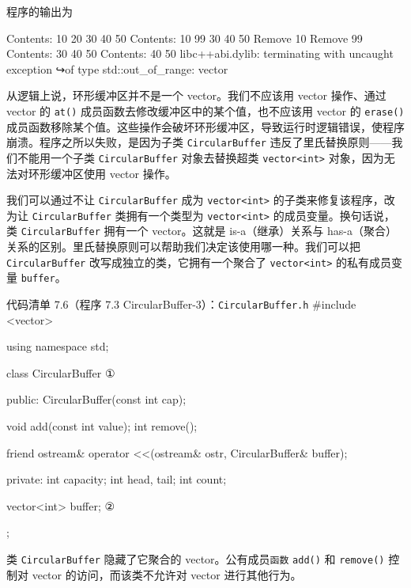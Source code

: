 程序的输出为

\begin{codebox}
Contents: 10 20 30 40 50 
Contents: 10 99 30 40 50 
Remove 10
Remove 99
Contents: 30 40 50 
Contents: 40 50 libc++abi.dylib: terminating with uncaught exception 
↪of type std::out_of_range: vector
\end{codebox}

从逻辑上说，环形缓冲区并不是一个 vector。我们不应该用 vector 操作、通过 vector 的 \texttt{at()} 成员函数去修改缓冲区中的某个值，也不应该用 vector 的 \texttt{erase()} 成员函数移除某个值。这些操作会破坏环形缓冲区，导致运行时逻辑错误，使程序崩溃。程序之所以失败，是因为子类 \texttt{Circular\allowbreak{}Buffer} 违反了里氏替换原则——我们不能用一个子类 \texttt{Circular\allowbreak{}Buffer} 对象去替换超类 \texttt{vector<int>} 对象，因为无法对环形缓冲区使用 vector 操作。

我们可以通过不让 \texttt{Circular\allowbreak{}Buffer} 成为 \texttt{vector<int>} 的子类来修复该程序，改为让 \texttt{Circular\allowbreak{}Buffer} 类拥有一个类型为 \texttt{vector<int>} 的成员变量。换句话说，类 \texttt{Circular\allowbreak{}Buffer} 拥有一个 vector。这就是 is-a（继承）关系与 has-a（聚合）关系的区别。里氏替换原则可以帮助我们决定该使用哪一种。我们可以把 \texttt{Circular\allowbreak{}Buffer} 改写成独立的类，它拥有一个聚合了 \texttt{vector<int>} 的私有成员变量 \texttt{buffer}。

\begin{codeboxt}{代码清单 7.6（程序 7.3 CircularBuffer-3）：\texttt{Circular\allowbreak{}Buffer.\allowbreak{}h}}
#include <vector>

using namespace std;

class CircularBuffer           ①
{

public:
    CircularBuffer(const int cap);

    void add(const int value);
    int remove();

    friend ostream& operator <<(ostream& ostr,
                                CircularBuffer& buffer);

private:
    int capacity;
    int head, tail;
    int count;

    vector<int> buffer;      ②
};
\end{codeboxt}
\par
{}\par

类 \texttt{Circular\allowbreak{}Buffer} 隐藏了它聚合的 vector。公有成员\texttt{函数} \texttt{add()} 和 \texttt{remove()} 控制对 vector 的访问，而该类不允许对 vector 进行其他行为。

